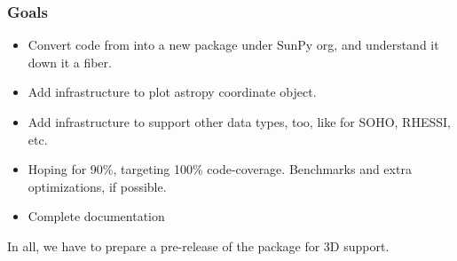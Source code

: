 \subsubsection{Goals}

\begin{itemize}
    \item Convert code from \pr into a new package under SunPy org, and understand it down it a fiber.
    \item Add infrastructure to plot astropy coordinate object.
    \item Add infrastructure to support other data types, too, like for SOHO, RHESSI, etc.
    \item Hoping for 90\%, targeting 100\% code-coverage. Benchmarks and extra optimizations, if possible.
    \item Complete documentation
\end{itemize}

In all, we have to prepare a pre-release of the package for 3D support.
